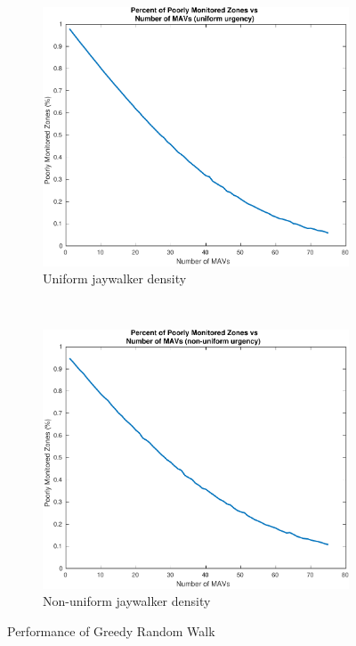 \documentclass{article}
\begin{document}
\begin{figure}[H]
\center
\begin{subfigure}[b]{0.5\textwidth}
  \center
  \includegraphics[width=\textwidth]{figures/random_walk_part1-crop.pdf}
  \caption{Uniform jaywalker density}
  \label{fig:random_uniform}
\end{subfigure}~
\begin{subfigure}[b]{0.5\textwidth}
  \center
  \includegraphics[width=\textwidth]{figures/random_walk_part3-crop.pdf}
  \caption{Non-uniform jaywalker density}
  \label{fig:random_nonuniform}
\end{subfigure}
\caption{Performance of Greedy Random Walk}
\label{fig:greedy_performance}
\end{figure}
\end{document}
